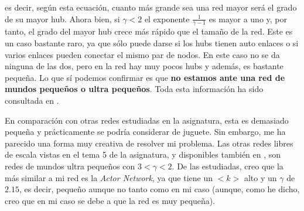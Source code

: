 \documentclass[10pt,a4paper,spanish]{article}
\numberwithin{equation}{section} %
\numberwithin{figure}{section} %
\numberwithin{table}{section} %
\begin{document}
es decir, según esta ecuación, cuanto más grande sea una red mayor será el grado de su mayor hub. Ahora bien, si $\gamma < 2$ el exponente $\frac{1}{\gamma - 1}$ es mayor a uno y, por tanto, el grado del mayor hub crece más rápido que el tamaño de la red. Este es un caso bastante raro, ya que sólo puede darse si los hubs tienen auto enlaces o si varios enlaces pueden conectar el mismo par de nodos. En este caso no se da ninguna de las dos, pero en la red hay muy pocos hubs y además, es bastante pequeña. Lo que sí podemos confirmar es que \textbf{no estamos ante una red de mundos pequeños o ultra pequeños}. Toda esta información ha sido consultada en \cite{scalefree}.


En comparación con otras redes estudiadas en la asignatura, esta es demasiado pequeña y prácticamente se podría considerar de juguete. Sin embargo, me ha parecido una forma muy creativa de resolver mi problema. Las otras redes libres de escala vistas en el tema 5 de la asignatura, y disponibles también en \cite{scalefree}, son redes de mundos ultra pequeños con $3 < \gamma < 2$. De las estudiadas, creo que la más similar a mi red es la \textit{Actor Network}, ya que tiene un $<k>$ alto y un $\gamma$ de $2.15$, es decir, pequeño aunque no tanto como en mi caso (aunque, como he dicho, creo que en mi caso se debe a que la red es muy pequeña).

\end{document}

